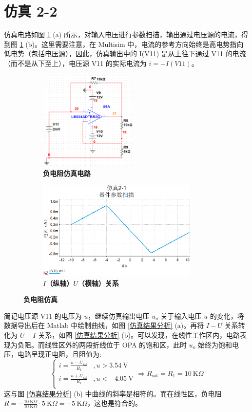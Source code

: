 \documentclass[UTF8]{report}
\def\KO{\ \mathrm{K}\Omega}
\theoremstyle{MyLineTheoremStyle} %
\theoremstyle{MyBlockTheoremStyle} %
\theoremstyle{MySubsubsectionStyle} %
\begin{document}
\section{仿真 2-2}

仿真电路如图 \ref{负电阻仿真} (a) 所示，对输入电压进行参数扫描，输出通过电压源的电流，得到图 \ref{负电阻仿真} (b)。这里需要注意，在 Multisim 中，电流的参考方向始终是高电势指向低电势（包括电压源），因此，仿真输出中的 I(V11) 是从上往下通过 V11 的电流（而不是从下至上），电压源 V11 的实际电流为 $i = -I(V11)$。

\begin{figure}[H]\centering
\begin{subfigure}[t]{0.47\textwidth}\centering
    \includegraphics[height=140pt]{assets/3/0649949f48a11f77b47f406012e3f7a8.png}
    \caption{\bfseries 负电阻仿真电路 }
\end{subfigure}\begin{subfigure}[t]{0.5\textwidth}\centering
    \includegraphics[height=140pt]{assets/3/83d7126e6d74b406acb4bbc94900f2c6.png}
    \caption{\bfseries $I$（纵轴）$U$（横轴）关系 }
\end{subfigure}
\caption{\bfseries 负电阻仿真 }\label{负电阻仿真}
\end{figure}

简记电压源 V11 的电压为 $u$，继续仿真输出电压 $u_o$ 关于输入电压 $u$ 的变化，将数据导出后在 Matlab 中绘制曲线，如图 \ref{仿真结果分析} (a)。再将 $I-U$ 关系转化为 $U-I$ 关系，如图 \ref{仿真结果分析} (b)。可以发现，在线性工作区内，电路表现为负阻。而线性区外的两段折线位于 OPA 的饱和区，此时 $u_o$ 始终为饱和电压，电路呈现正电阻，且阻值为:
\begin{equation}
\begin{cases}
    i = \frac{u - U_{\text{sat}}}{R_1} &, u > 3.54\ \mathrm{V} \\ 
    i = \frac{u + U_{\text{sat}}}{R_1} &, u < -4.05 \ \mathrm{V} \\ 
\end{cases}\Longrightarrow 
R_{\text{sat}} = R_1 = 10 \KO
\end{equation}
这与图 \ref{仿真结果分析} (b) 中曲线的斜率是相符的。而在线性区，负电阻 $R = -\frac{10 \KO}{10 \KO} \cdot 5 \KO = - 5 \KO$，这也是符合的。
\end{document}
